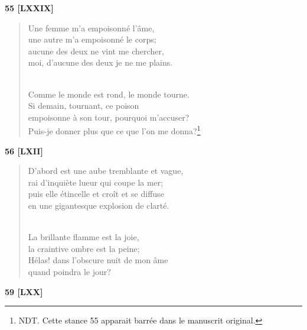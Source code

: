 \documentclass[a4paper,12pt]{book}
\begin{document}

\bigskip

\begin{center} {\bf 55 [LXXIX]} \end{center}

\begin{verse}
Une femme m'a empoisonné l'âme, \\
une autre m'a empoisonné le corps; \\
aucune des deux ne vint me chercher, \\
moi, d'aucune des deux je ne me plains. \\ \

Comme le monde est rond, le monde tourne. \\
Si demain, tournant, ce poison \\
empoisonne à son tour, pourquoi m'accuser? \\
Puis-je donner plus que ce que l'on me donna?\footnote{NDT. Cette stance 55 apparait barrée dans le manuscrit original.} \\
\end{verse}

\bigskip

\begin{center} {\bf 56 [LXII]} \end{center}

\begin{verse}
D'abord est une aube tremblante et vague, \\
rai d'inquiète lueur qui coupe la mer; \\
puis elle étincelle et croît et se diffuse \\
en une gigantesque explosion de clarté. \\ \

La brillante flamme est la joie, \\
la craintive ombre est la peine; \\
Hélas! dans l'obscure nuit de mon âme \\
quand poindra le jour? \\
\end{verse}

\bigskip

\begin{center} {\bf 59 [LXX]} \end{center}
\end{document}
